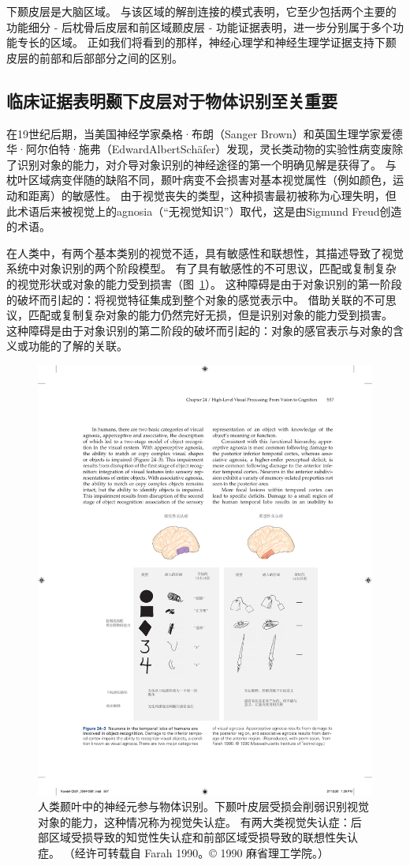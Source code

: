 下颞皮层是大脑区域。
与该区域的解剖连接的模式表明，它至少包括两个主要的功能细分 - 后枕骨后皮层和前区域颞皮层 - 功能证据表明，进一步分别属于多个功能专长的区域。
正如我们将看到的那样，神经心理学和神经生理学证据支持下颞皮层的前部和后部部分之间的区别。



\subsection{临床证据表明颞下皮层对于物体识别至关重要}

在19世纪后期，当美国神经学家桑格·布朗（Sanger Brown）和英国生理学家爱德华·阿尔伯特·施弗（EdwardAlbertSchäfer）发现，灵长类动物的实验性病变废除了识别对象的能力，对介导对象识别的神经途径的第一个明确见解是获得了。
与枕叶区域病变伴随的缺陷不同，颞叶病变不会损害对基本视觉属性（例如颜色，运动和距离）的敏感性。
由于视觉丧失的类型，这种损害最初被称为心理失明，但此术语后来被视觉上的agnosia（“无视觉知识”）取代，这是由Sigmund Freud创造的术语。


在人类中，有两个基本类别的视觉不适，具有敏感性和联想性，其描述导致了视觉系统中对象识别的两个阶段模型。
有了具有敏感性的不可思议，匹配或复制复杂的视觉形状或对象的能力受到损害（图~\ref{fig:24_3}）。
这种障碍是由于对象识别的第一阶段的破坏而引起的：将视觉特征集成到整个对象的感觉表示中。
借助关联的不可思议，匹配或复制复杂对象的能力仍然完好无损，但是识别对象的能力受到损害。
这种障碍是由于对象识别的第二阶段的破坏而引起的：对象的感官表示与对象的含义或功能的了解的关联。


\begin{figure}[htbp]
	\centering
	\includegraphics[width=0.8\linewidth]{chap24/fig_24_3}
	\caption{人类颞叶中的神经元参与物体识别。下颞叶皮层受损会削弱识别视觉对象的能力，这种情况称为视觉失认症。 有两大类视觉失认症：后部区域受损导致的知觉性失认症和前部区域受损导致的联想性失认症。 （经许可转载自 Farah 1990。© 1990 麻省理工学院。）}
	\label{fig:24_3}
\end{figure}


